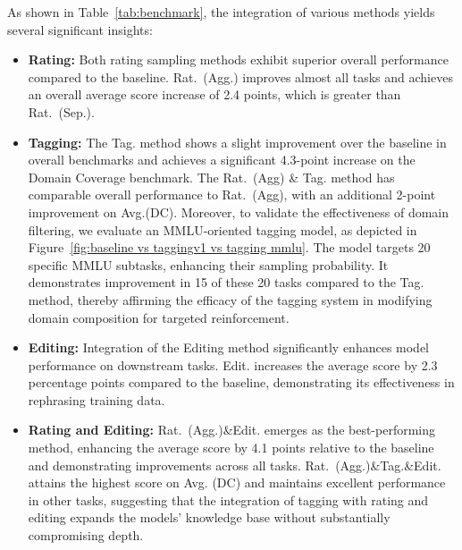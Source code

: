 \documentclass[11pt]{article}
\begin{document}

As shown in Table~\ref{tab:benchmark}, the integration of various methods yields several significant insights:


\begin{itemize}
    \vspace{2pt} 
    \item \textbf{Rating:} Both rating sampling methods exhibit superior overall performance compared to the baseline. Rat.\ (Agg.) improves almost all tasks and achieves an overall average score increase of 2.4 points, which is greater than Rat.\ (Sep.).
    \vspace{2pt} 
    \item \textbf{Tagging:} The Tag. method shows a slight improvement over the baseline in overall benchmarks and achieves a significant 4.3-point increase on the Domain Coverage benchmark. The Rat.\ (Agg) \& Tag. method has comparable overall performance to Rat.\ (Agg), with an additional 2-point improvement on Avg.(DC). Moreover, to validate the effectiveness of domain filtering, we evaluate an MMLU-oriented tagging model, as depicted in Figure~\ref{fig:baseline vs taggingv1 vs tagging mmlu}. The model targets 20 specific MMLU subtasks, enhancing their sampling probability. It demonstrates improvement in 15 of these 20 tasks compared to the Tag. method, thereby affirming the efficacy of the tagging system in modifying domain composition for targeted reinforcement.
    \vspace{2pt} 
    \item \textbf{Editing:} Integration of the Editing method significantly enhances model performance on downstream tasks. Edit. increases the average score by 2.3 percentage points compared to the baseline, demonstrating its effectiveness in rephrasing training data.
    \vspace{2pt} 
    \item \textbf{Rating and Editing:} Rat.\ (Agg.)\&Edit. emerges as the best-performing method, enhancing the average score by 4.1 points relative to the baseline and demonstrating improvements across all tasks. Rat.\ (Agg.)\&Tag.\&Edit. attains the highest score on Avg. (DC) and maintains excellent performance in other tasks, suggesting that the integration of tagging with rating and editing expands the models' knowledge base without substantially compromising depth.

\end{itemize}
\end{document}
